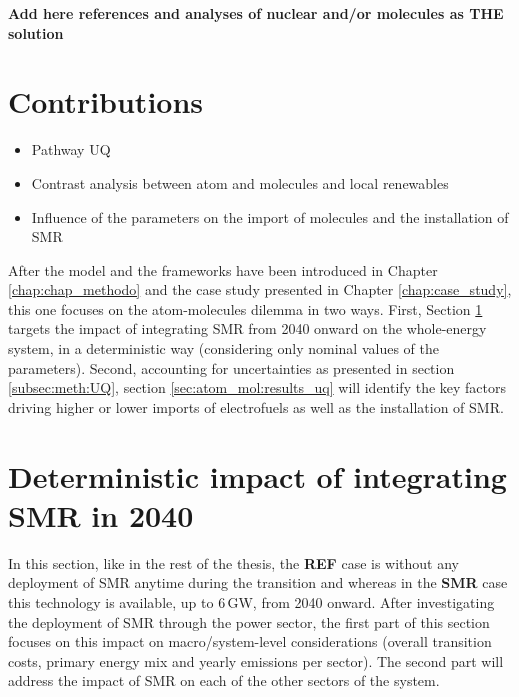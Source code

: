 \textbf{Add here references and analyses of nuclear and/or molecules as THE solution} \cite{IEA_Nuclear_2022}


\section*{Contributions}
\label{sec:atom_mol:contributions}
\begin{itemize}
\item Pathway UQ
\item Contrast analysis between atom and molecules and local renewables
\item Influence of the parameters on the import of molecules and the installation of SMR
\end{itemize}

After the model and the frameworks have been introduced in Chapter \ref{chap:chap_methodo} and the case study presented in Chapter \ref{chap:case_study}, this one focuses on the atom-molecules dilemma in two ways. First, Section \ref{sec:atom_mol:results_deter} targets the impact of integrating \gls{SMR} from 2040 onward on the whole-energy system, in a deterministic way (\ie considering only nominal values of the parameters). Second, accounting for uncertainties as presented in section \ref{subsec:meth:UQ}, section \ref{sec:atom_mol:results_uq} will identify the key factors driving higher or lower imports of electrofuels as well as the installation of \gls{SMR}. 

\section{Deterministic impact of integrating \gls{SMR} in 2040}
\label{sec:atom_mol:results_deter} 
In this section, like in the rest of the thesis, the \textbf{REF} case is without any deployment of \gls{SMR} anytime during the transition and whereas in the \textbf{SMR} case this technology is available, up to 6\,GW, from 2040 onward. After investigating the deployment of \gls{SMR} through the power sector, the first part of this section focuses on this impact on macro/system-level considerations (\ie overall transition costs, primary energy mix and yearly emissions per sector). The second part will address the impact of \gls{SMR} on each of the other sectors of the system.

